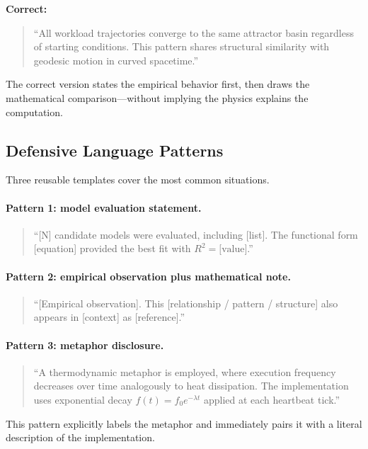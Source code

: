 \noindent\textbf{Correct:}
\begin{quote}
``All workload trajectories converge to the same attractor basin regardless of
starting conditions. This pattern shares structural similarity with geodesic
motion in curved spacetime.''
\end{quote}

The correct version states the empirical behavior first, then draws the
mathematical comparison---without implying the physics explains the
computation.

\subsection{Defensive Language Patterns}

Three reusable templates cover the most common situations.

\paragraph{Pattern 1: model evaluation statement.}
\begin{quote}
``[N] candidate models were evaluated, including [list]. The functional form
[equation] provided the best fit with $R^2 = \text{[value]}$.''
\end{quote}

\paragraph{Pattern 2: empirical observation plus mathematical note.}
\begin{quote}
``[Empirical observation]. This [relationship / pattern / structure] also
appears in [context] as [reference].''
\end{quote}

\paragraph{Pattern 3: metaphor disclosure.}
\begin{quote}
``A thermodynamic metaphor is employed, where execution frequency decreases
over time analogously to heat dissipation. The implementation uses exponential
decay $f(t) = f_0 e^{-\lambda t}$ applied at each heartbeat tick.''
\end{quote}

This pattern explicitly labels the metaphor and immediately pairs it with a
literal description of the implementation.

